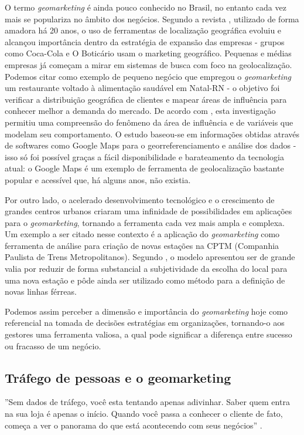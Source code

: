 O termo \emph{geomarketing} é ainda pouco conhecido no Brasil, no entanto cada
vez mais se populariza no âmbito dos negócios. Segundo a revista
, utilizado de forma amadora há 20 anos, o uso de ferramentas
de localização geográfica evoluiu e alcançou importância dentro da estratégia de
expansão das empresas - grupos como Coca-Cola e O Boticário usam o marketing
geográfico. Pequenas e médias empresas já começam a mirar em sistemas de busca
com foco na geolocalização. Podemos citar como exemplo de pequeno negócio que
empregou o \emph{geomarketing} um restaurante voltado à alimentação saudável em
Natal-RN - o objetivo foi verificar a distribuição geográfica de clientes e
mapear áreas de influência para conhecer melhor a demanda do mercado. De acordo
com , esta investigação permitiu uma compreensão do
fenômeno da área de influência e de variáveis que modelam seu comportamento. O
estudo baseou-se em informações obtidas através de softwares como Google
Maps para o georreferenciamento e análise dos dados - isso só foi possível
graças a fácil disponibilidade e barateamento da tecnologia atual: o
Google Maps é um exemplo de ferramenta de geolocalização bastante popular
e acessível que, há alguns anos, não existia.

Por outro lado, o acelerado desenvolvimento tecnológico e o crescimento de
grandes centros urbanos criaram uma infinidade de possibilidades em aplicações
para o \emph{geomarketing}, tornando a ferramenta cada vez mais ampla e
complexa. Um exemplo a ser citado nesse contexto é a aplicação do
\emph{geomarketing} como ferramenta de análise para criação de novas estações na
CPTM (Companhia Paulista de Trens Metropolitanos). Segundo
, o modelo apresentou ser de grande valia por reduzir de
forma substancial a subjetividade da escolha do local para uma nova estação e
pôde ainda ser utilizado como método para a definição de novas linhas férreas.

Podemos assim perceber a dimensão e importância do \emph{geomarketing} hoje como
referencial na tomada de decisões estratégias em organizações,
tornando-o aos gestores uma ferramenta valiosa, a qual pode significar a
diferença entre sucesso ou fracasso de um negócio.

\subsection{Tráfego de pessoas e o geomarketing}

''Sem dados de tráfego, você esta tentando apenas adivinhar. Saber quem entra na sua loja é apenas o início. Quando você passa a conhecer o cliente de fato, começa a ver o panorama do que está acontecendo com seus negócios'' \cite{Shoppertrak2017}.


